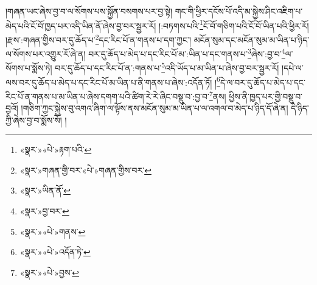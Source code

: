 །གཞན་ཡང་ཞེས་བྱ་བ་ལ་སོགས་པས་སྐྱོན་བསགས་པར་བྱ་སྟེ། གང་གི་ཕྱིར་དངོས་པོ་འདི་མ་སྐྱེས་ཤིང་འཇིག་པ་མེད་པའི་ངོ་བོ་ཁྱད་པར་འདི་ཡིན་ནོ་ཞེས་བྱ་བར་སྦྱར་རོ། །:བཏགས་པའི་\footnote{«སྣར་»«པེ་»རྟག་པའི་}ངོ་བོ་གཅིག་པའི་ངོ་བོ་ཡིན་པའི་ཕྱིར་རོ། །རྫས་:གཞན་གྱིས་བར་དུ་ཆོད་པ་\footnote{«སྣར་»གཞན་གྱི་བར་«པེ་»གཞན་གྱིས་བར་}དང་རིང་པོ་ན་གནས་པ་དག་ཀྱང་། མངོན་སུམ་དང་མངོན་སུམ་མ་ཡིན་པ་ཉིད་ལ་སོགས་པར་འགྱུར་རོ་ཞེ་ན། བར་དུ་ཆོད་པ་མེད་པ་དང་རིང་པོ་མ་:ཡིན་པ་དང་གནས་པ་\footnote{«སྣར་»ཡིན་ནོ་}ཞེས་:བྱ་བ་\footnote{«སྣར་»བྱ་བར་}ལ་སོགས་པ་སྨོས་ཏེ། བར་དུ་ཆོད་པ་དང་རིང་པོ་ན་:གནས་པ་\footnote{«སྣར་»«པེ་»གནས་}འདི་ཡོད་པ་མ་ཡིན་པ་ཞེས་བྱ་བར་སྦྱར་རོ། །དཔེ་ལ་ལས་བར་དུ་ཆོད་པ་མེད་པ་དང་རིང་པོ་མ་ཡིན་པ་ནི་གནས་པ་ཞེས་:འདོན་ཏོ། །\footnote{«སྣར་»«པེ་»འདོན་ཏེ་}དེ་ལ་བར་དུ་ཆོད་པ་མེད་པ་དང་རིང་པོ་ན་གནས་པ་མ་ཡིན་པ་ཞེས་དགག་པའི་ཚིག་རེ་རེ་ཞིང་བསྡུ་བ་:བྱ་བ་\footnote{«སྣར་»«པེ་»བྱས་}ནས། ཕྱིས་ནི་ཁྱད་པར་གྱི་བསྡུ་བ་བྱའོ། །གཅིག་ཀྱང་སྐྱེས་བུ་འགའ་ཞིག་ལ་ལྟོས་ནས་མངོན་སུམ་མ་ཡིན་པ་ལ་འགལ་བ་མེད་པ་ཉིད་དོ་ཞེ་ན། དེ་ཉིད་ཀྱི་ཞེས་བྱ་བ་སྨོས་སོ། །
